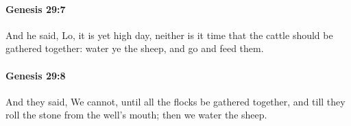		\paragraph{Genesis 29:7} %
			\label{GENESIS-29-7}

			And he said, Lo, it is yet high day, neither is it time that the cattle should be gathered together: water ye the sheep, and go and feed them.


		\paragraph{Genesis 29:8} %
			\label{GENESIS-29-8}

			And they said, We cannot, until all the flocks be gathered together, and till they roll the stone from the well's mouth; then we water the sheep.


